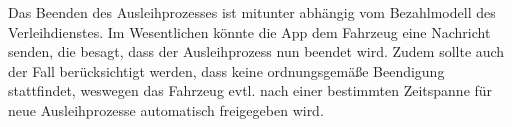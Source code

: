 Das Beenden des Ausleihprozesses ist mitunter abhängig vom Bezahlmodell des Verleihdienstes. Im Wesentlichen könnte die App dem Fahrzeug eine Nachricht senden, die besagt, dass der Ausleihprozess nun beendet wird. Zudem sollte auch der Fall berücksichtigt werden, dass keine ordnungsgemäße Beendigung stattfindet, weswegen das Fahrzeug evtl. nach einer bestimmten Zeitspanne für neue Ausleihprozesse automatisch freigegeben wird.